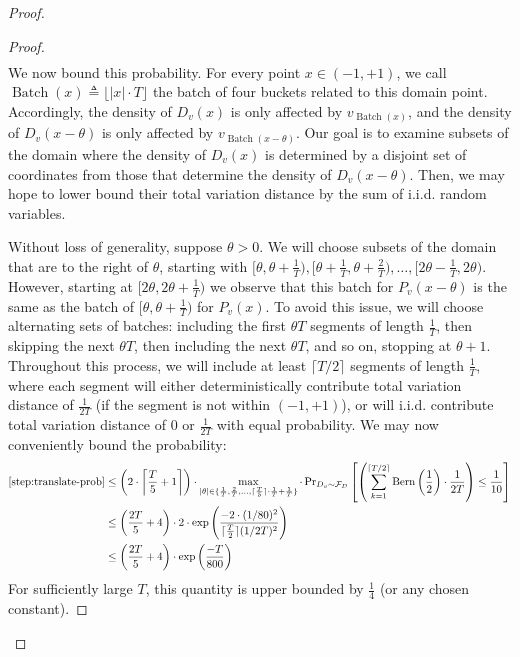 \begin{proof}
\begin{proof}
\begin{align*}
        \end{align*}
        We now bound this probability. For every point $x \in (-1,+1)$, we call $\operatorname{Batch}(x) \triangleq \lfloor |x| \cdot T \rfloor$ the batch of four buckets related to this domain point. Accordingly, the density of $D_{v}(x)$ is only affected by $v_{\operatorname{Batch}(x)}$, and the density of $D_{v}(x-\theta)$ is only affected by $v_{\operatorname{Batch}(x-\theta)}$. Our goal is to examine subsets of the domain where the density of $D_v(x)$ is determined by a disjoint set of coordinates from those that determine the density of $D_v(x-\theta)$. Then, we may hope to lower bound their total variation distance by the sum of i.i.d. random variables.

        Without loss of generality, suppose $\theta > 0$. We will choose subsets of the domain that are to the right of $\theta$, starting with $[\theta,\theta+\frac{1}{T}), [\theta + \frac{1}{T}, \theta + \frac{2}{T}),\dots, [2\theta -\frac{1}{T},2\theta)$. However, starting at $[2\theta,2\theta+\frac{1}{T})$ we observe that this batch for $P_v(x-\theta)$ is the same as the batch of $[\theta,\theta + \frac{1}{T})$ for $P_v(x)$. To avoid this issue, we will choose alternating sets of batches: including the first $\theta T$ segments of length $\frac{1}{T}$, then skipping the next $\theta T$, then including the next $\theta T$, and so on, stopping at $\theta + 1$. Throughout this process, we will include at least $\lceil T/2 \rceil$ segments of length $\frac{1}{T}$, where each segment will either deterministically contribute total variation distance of $\frac{1}{2T}$ (if the segment is not within $(-1,+1)$), or will i.i.d. contribute total variation distance of $0$ or $\frac{1}{2T}$ with equal probability. We may now conveniently bound the probability:
        \begin{align*}
            \cref{step:translate-prob} & \le \left(2 \cdot \left\lceil \frac{T}{5} + 1 \right\rceil\right) \cdot \max_{|\theta| \in \{\frac{1}{T},\frac{2}{T},\dots, \lceil \frac{T}{5} \rceil \cdot \frac{1}{T} + \frac{1}{T} \}} \cdot \Pr_{D_v \sim \mathcal{F}_D}\left[\left(\sum_{k=1}^{\lceil T/2 \rceil} \bern\left(\frac{1}{2}\right) \cdot \frac{1}{2T} \right) \le \frac{1}{10}\right] \\
            & \le \left(\frac{2T}{5} + 4\right) \cdot 2 \cdot \exp\left( \frac{-2 \cdot (1/80)^2}{\lceil \frac{T}{2} \rceil (1/2T)^2}\right)\\
            & \le  \left(\frac{2T}{5} + 4\right) \cdot \exp\left( \frac{-T}{800}\right)
        \end{align*}
        For sufficiently large $T$, this quantity is upper bounded by $\frac{1}{4}$ (or any chosen constant).
\end{proof}


\end{proof}
